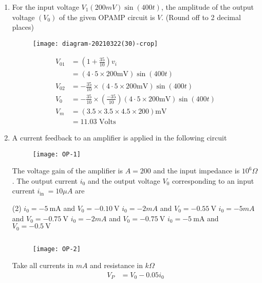\begin{enumerate}
\begin{answer}
\end{answer}
	\item For the input voltage $V_{1}(200 m V) \sin (400 t)$, the amplitude of the output voltage $\left(V_{0}\right)$ of the given OPAMP circuit is $V$. (Round off to 2 decimal places)
\begin{figure}[H]
	\centering
	\texttt{[image: diagram-20210322(30)-crop]}
\end{figure}
\begin{answer}
\begin{align*}
V_{01}&=\left(1+\frac{35}{10}\right) v_{i}\\&=(4 \cdot 5 \times 200 \mathrm{mV}) \sin (400 t) \\
V_{02}&=-\frac{35}{10} \times(4 \cdot 5 \times 200 \mathrm{mV}) \sin (400 t) \\
V_{0}&=-\frac{35}{10} \times\left(\frac{-35}{10}\right)(4 \cdot 5 \times 200 \mathrm{mV}) \sin (400 t) \\
V_{m}&=(3.5 \times 3.5 \times 4.5 \times 200) \mathrm{mV}\\&=11.03 \text { Volts }
\end{align*}
\end{answer}
\item A current feedback to an amplifier is applied in the following circuit 
\begin{figure}[H]
	\centering
	\texttt{[image: OP-1]}
\end{figure}
The voltage gain of the amplifier is $A=200$ and the input impedance is $10^{6} \Omega$. The output current $i_{0}$ and the output voltage $V_{0}$ corresponding to an input current $i_{\text {in }}=10 \mu A$ are
 \begin{tasks}(2)
	\task[\textbf{a.}]$i_{0}=-5 \mathrm{~mA}$ and $V_{0}=-0.10 \mathrm{~V}$
	\task[\textbf{b.}]$i_{0}=-2 m A$ and $V_{0}=-0.55 \mathrm{~V}$
	\task[\textbf{c.}]$i_{0}=-5 m A$ and $V_{0}=-0.75 \mathrm{~V}$
	\task[\textbf{d.}] $i_{0}=-2 m A$ and $V_{0}=-0.75 \mathrm{~V}$
	\task[\textbf{e.}]$i_{0}=-5 \mathrm{~mA}$ and $V_{0}=-0.5 \mathrm{~V}$
\end{tasks}
\begin{answer}$\left. \right. $
	\begin{figure}[H]
		\centering
		\texttt{[image: OP-2]}
	\end{figure}
		Take all currents in $m A$ and resistance in $k \Omega$
	\begin{align*}
	V_{P}&=V_{0}-0.05 i_{0}\\

\end{align*}
\end{answer}
\end{enumerate}
